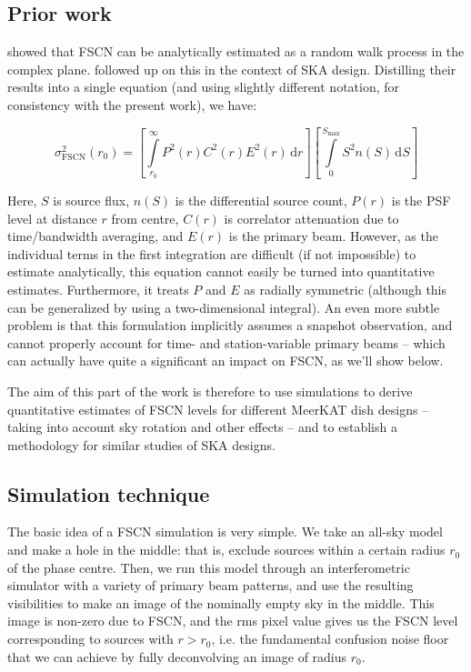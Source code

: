 \documentclass{aa}
\begin{document}
\subsection{Prior work}

\citet[][see Appendix B]{VLA146} showed that FSCN can be analytically estimated as a random walk process in the complex plane. \citet[][]{SKA54-expa,SKA54} followed up on this in the context of SKA design. Distilling their results into a single equation (and using slightly different notation, for consistency with the present work), we have:

\newcommand{\DD}[1]{\,\mathrm{d}{#1}}

\begin{equation}
\label{eq:fscn}
  \sigma^2_\mathrm{FSCN}(r_0) = \left [ \int\limits_{r_0}^{\infty} P^2(r)C^2(r)E^2(r) \DD{r} \right ]
\left[ \int\limits_{0}^{S_\mathrm{max}} S^2n(S)\DD{S}\right ] 
\end{equation}

Here, $S$ is source flux, $n(S)$ is the differential source count, $P(r)$ is the PSF level at distance $r$ from centre, $C(r)$ is correlator attenuation due to time/bandwidth averaging, and $E(r)$ is the primary beam. However, as the individual terms in the first integration are difficult (if not impossible) to estimate analytically, this equation cannot easily be turned into quantitative estimates. Furthermore, it treats $P$ and $E$ as radially symmetric (although this can be generalized by using a two-dimensional integral). An even more subtle problem is that this formulation implicitly assumes a snapshot observation, and cannot properly account for time- and station-variable primary beams -- which can actually have quite a significant an impact on FSCN, as we'll show below.

The aim of this part of the work is therefore to use simulations to derive quantitative estimates of FSCN levels for different MeerKAT dish designs -- taking into account sky rotation and other effects -- and to establish a methodology for similar studies of SKA designs.

\subsection{Simulation technique}

The basic idea of a FSCN simulation is very simple. We take an all-sky model and make a hole in the middle: that is, exclude sources within a certain radius $r_0$ of the phase centre. Then, we run this model through an interferometric simulator with a variety of primary beam patterns, and use the resulting visibilities to make an image of the nominally empty sky in the middle. This image is non-zero due to FSCN, and the rms pixel value gives us the FSCN level corresponding to sources with $r>r_0$, i.e. the fundamental confusion noise floor that we can achieve by fully deconvolving an image of radius $r_0$.
\end{document}
